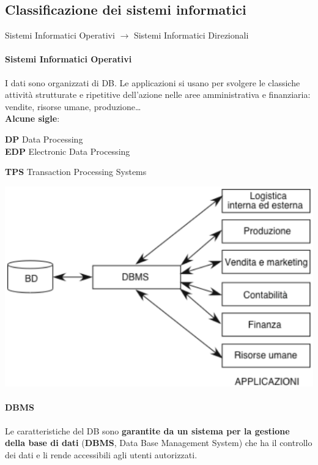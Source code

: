 \documentclass[10pt]{book}
\begin{document}
\subsection{Classificazione dei sistemi informatici}
\begin{center}
Sistemi Informatici Operativi $\longrightarrow$ Sistemi Informatici Direzionali
\end{center}
\begin{multicols}{2}
\paragraph{Sistemi Informatici Operativi} I dati sono organizzati di DB. Le applicazioni si usano per svolgere le classiche attività strutturate e ripetitive dell'azione nelle aree amministrativa e finanziaria: vendite, risorse umane, produzione\ldots\\
\textbf{Alcune sigle}:
\begin{list}{}{}
	\item \textbf{DP} Data Processing\\\textbf{EDP} Electronic Data Processing
	\item \textbf{TPS} Transaction Processing Systems
\end{list}
\begin{center}
	\includegraphics[scale=0.6]{sisinfop.png}
\end{center}
\paragraph{DBMS} Le caratteristiche del DB sono \textbf{garantite da un sistema per la gestione della base di dati} (\textbf{DBMS}, Data Base Management System) che ha il controllo dei dati e li rende accessibili agli utenti autorizzati.

\end{multicols}
\end{document}
